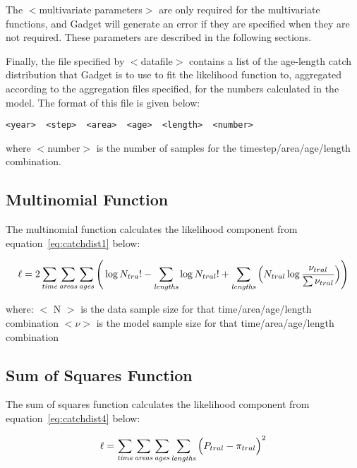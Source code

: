 \documentclass [a4paper, 10pt]{book}
\begin{document}
\bigskip
The $<$multivariate parameters$>$ are only required for the multivariate functions, and Gadget will generate an error if they are specified when they are not required.  These parameters are described in the following sections.

\bigskip
Finally, the file specified by $<$datafile$>$ contains a list of the age-length catch distribution that Gadget is to use to fit the likelihood function to, aggregated according to the aggregation files specified, for the numbers calculated in the model.  The format of this file is given below:

{\small\begin{verbatim}
<year>  <step>  <area>  <age>  <length>  <number>
\end{verbatim}}

where $<$number$>$ is the number of samples for the timestep/area/age/length combination.

\subsection{Multinomial Function}
The multinomial function calculates the likelihood component from equation~\ref{eq:catchdist1} below:

\begin{equation}\label{eq:catchdist1}
\ell = 2 \sum_{\it time}\sum_{\it areas}\sum_{\it ages} \Bigg( \log N_{tra}! - \sum_{\it lengths} \log N_{tral}! + \sum_{\it lengths} \Big( N_{tral} \log {\frac{\nu_{tral}}{\sum \nu_{tral}}} \Big) \Bigg)
\end{equation}

where:\newline
$<$ N $>$ is the data sample size for that time/area/age/length combination\newline
$<\nu>$ is the model sample size for that time/area/age/length combination

\newpage %
\subsection{Sum of Squares Function}
The sum of squares function calculates the likelihood component from equation~\ref{eq:catchdist4} below:

\begin{equation}\label{eq:catchdist4}
\ell = \sum_{\it time}\sum_{\it areas}\sum_{\it ages}\sum_{\it lengths} \Big( P_{tral} - \pi_{tral} \Big) ^2
\end{equation}
\end{document}
